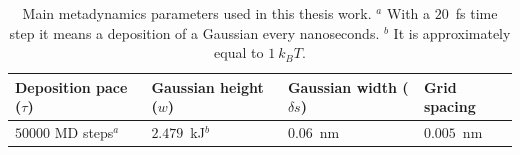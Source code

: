 \begin{table}[ht]
	\centering
	\begin{tabular}{llll}
		\toprule
		Deposition pace ($\tau$) & Gaussian height ($w$)& Gaussian width ($\delta s$) & Grid spacing \\ \toprule
		$50000$ \ac{MD} steps$^a$ & $2.479$~kJ$^b$ & $0.06$~nm & $0.005$~nm \\ \bottomrule
	\end{tabular}
	\caption{Main metadynamics parameters used in this thesis work. $^a$ With a $20$~fs time step it means a deposition of a Gaussian every nanoseconds. $^b$ It is approximately equal to $1~k_BT$.}
	\label{tab:metadynParam}
\end{table}


